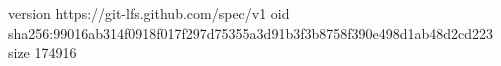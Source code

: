version https://git-lfs.github.com/spec/v1
oid sha256:99016ab314f0918f017f297d75355a3d91b3f3b8758f390e498d1ab48d2cd223
size 174916

